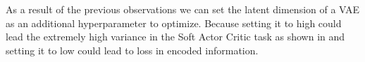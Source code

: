 As a result of the previous observations we can set the latent dimension of a VAE as an additional hyperparameter to optimize. Because setting it to high could lead the extremely high variance in the Soft Actor Critic task as shown in  and setting it to low could lead to loss in encoded information. 
